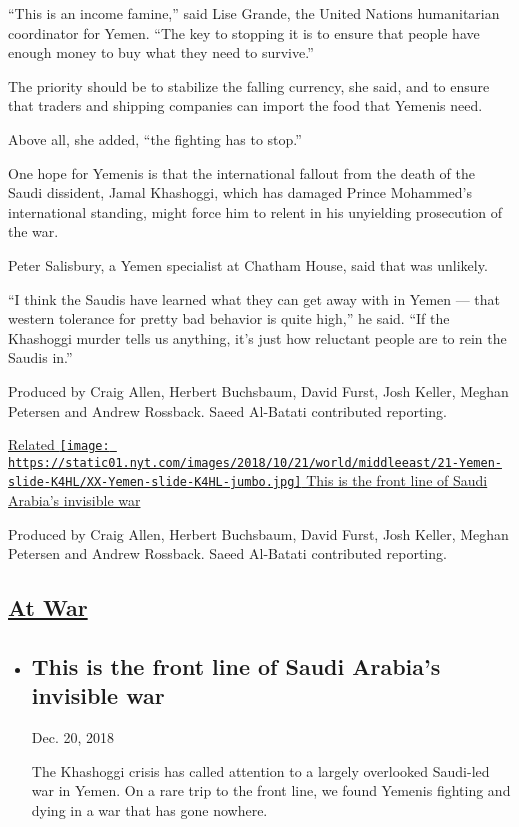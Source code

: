``This is an income famine,'' said Lise Grande, the United Nations
humanitarian coordinator for Yemen. ``The key to stopping it is to
ensure that people have enough money to buy what they need to survive.''

The priority should be to stabilize the falling currency, she said, and
to ensure that traders and shipping companies can import the food that
Yemenis need.

Above all, she added, ``the fighting has to stop.''

One hope for Yemenis is that the international fallout from the death of
the Saudi dissident, Jamal Khashoggi, which has damaged Prince
Mohammed's international standing, might force him to relent in his
unyielding prosecution of the war.

Peter Salisbury, a Yemen specialist at Chatham House, said that was
unlikely.

``I think the Saudis have learned what they can get away with in Yemen
--- that western tolerance for pretty bad behavior is quite high,'' he
said. ``If the Khashoggi murder tells us anything, it's just how
reluctant people are to rein the Saudis in.''

Produced by Craig Allen, Herbert Buchsbaum, David Furst, Josh Keller,
Meghan Petersen and Andrew Rossback. Saeed Al-Batati contributed
reporting.

\href{https://www.nytimes.com/interactive/2018/10/20/world/middleeast/saudi-arabia-invisible-war-yemen.html}{Related
\texttt{[image: https://static01.nyt.com/images/2018/10/21/world/middleeast/21-Yemen-slide-K4HL/XX-Yemen-slide-K4HL-jumbo.jpg]}
This is the front line of Saudi Arabia's invisible war}

Produced by Craig Allen, Herbert Buchsbaum, David Furst, Josh Keller,
Meghan Petersen and Andrew Rossback. Saeed Al-Batati contributed
reporting.

\hypertarget{at-war}{%
\subsection{\texorpdfstring{\href{https://www.nytimes.com/spotlight/atwar}{At
War}}{At War}}\label{at-war}}

\begin{itemize}
\item
  \href{https://www.nytimes.com/interactive/2018/10/20/world/middleeast/saudi-arabia-invisible-war-yemen.html}{}

  \hypertarget{this-is-the-front-line-of-saudi-arabias-invisible-war}{%
  \subsection{This is the front line of Saudi Arabia's invisible
  war}\label{this-is-the-front-line-of-saudi-arabias-invisible-war}}

  Dec. 20, 2018

  The Khashoggi crisis has called attention to a largely overlooked
  Saudi-led war in Yemen. On a rare trip to the front line, we found
  Yemenis fighting and dying in a war that has gone nowhere.
\end{itemize}

